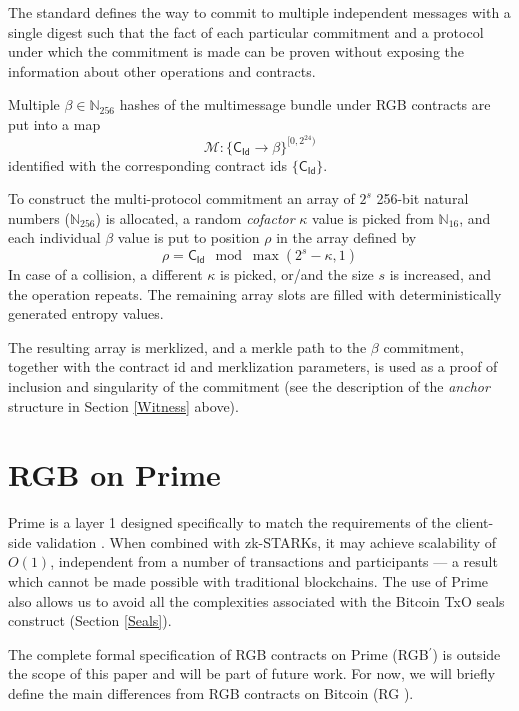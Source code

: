 \documentclass[9pt,oneside]{amsart}
\def\bitcoin{%
  \leavevmode
  \vtop{\offinterlineskip %
    \setbox0=\hbox{B}%
    \setbox2=\hbox to\wd0{\hfil\hskip-.03em
    \vrule height .3ex width .15ex\hskip .08em
    \vrule height .3ex width .15ex\hfil}
    \vbox{\copy2\box0}\box2}}
\begin{document}
\begin{multicols}{2}
The standard defines the way to commit to multiple independent messages
with a single digest such that the fact of each particular commitment
and a protocol under which the commitment is made can be proven without
exposing the information about other operations and contracts.

Multiple $\beta \in \mathbb{N}_{256}$ hashes of the multimessage bundle under
RGB contracts are put into a map
\noindent
\begin{equation}
\mathcal{M}: \{ \mathsf{C_{Id}} \rightarrow \beta \}^{[0, 2^{24})}
\end{equation}
\noindent
identified with the corresponding contract ids $\{ \mathsf{C_{Id}} \}$.

To construct the multi-protocol commitment an array of $2^s$
256-bit natural numbers ($\mathbb{N}_{256}$) is allocated,
a random \emph{cofactor} $\kappa$ value is picked from $\mathbb{N}_{16}$,
and each individual $\beta$ value is put to position $\rho$ in the array defined by
\noindent
\begin{equation}
    \rho = \mathsf{C_{Id}} \mod \max(2^s - \kappa, 1)
\end{equation}
\noindent
In case of a collision, a different $\kappa$ is picked,
or/and the size $s$ is increased, and the operation repeats.
The remaining array slots are filled with deterministically generated entropy values.

The resulting array is merklized, and a merkle path to the $\beta$ commitment,
together with the contract id and merklization parameters, is used as a proof of
inclusion and singularity of the commitment
(see the description of the \emph{anchor} structure in Section \ref{Witness} above).


\newpage
\section{RGB on Prime}

Prime is a layer 1 designed specifically to match the requirements of the client-side validation \cite{Prime}.
When combined with zk-STARKs, it may achieve scalability of $O(1)$,
independent from a number of transactions and participants \cite{Prime} —
a result which cannot be made possible with traditional blockchains.
The use of Prime also allows us to avoid all the complexities associated
with the Bitcoin TxO seals construct (Section \ref{Seals}).

The complete formal specification of RGB contracts on Prime (RGB$^\prime$)
is outside the scope of this paper and will be part of future work.
For now, we will briefly define the main differences from RGB contracts on Bitcoin (RG\bitcoin).


\end{multicols}
\end{document}
